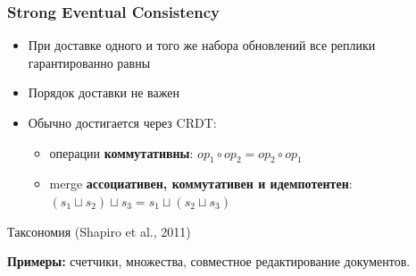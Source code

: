 \documentclass{beamer}
\newcommand{\merge}{\mathbin{\sqcup}}
\begin{document}
\begin{frame}
\frametitle{Strong Eventual Consistency}

\begin{itemize}
  \item При доставке одного и того же набора обновлений все реплики гарантированно равны
  \item Порядок доставки не важен
  \item Обычно достигается через CRDT:
  \begin{itemize}
    \item операции \textbf{коммутативны}: $op_1 \circ op_2 = op_2 \circ op_1$
    \item merge \textbf{ассоциативен, коммутативен и идемпотентен}: $(s_1 \merge s_2) \merge s_3 = s_1 \merge (s_2 \merge s_3)$
  \end{itemize}
\end{itemize}

\begin{exampleblock}{Таксономия (Shapiro et al., 2011)}
\begin{center}
\end{center}
\end{exampleblock}

\textbf{Примеры:} счетчики, множества, совместное редактирование документов.

\end{frame}
\end{document}
